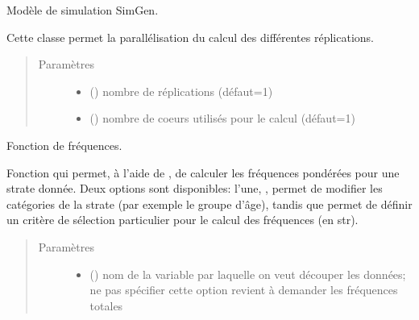 \documentclass[letterpaper,10pt,french]{sphinxmanual}
\begin{document}
\begin{fulllineitems}
\label{\detokenize{code:id0}}
Modèle de simulation SimGen.

Cette classe permet la parallélisation du calcul des différentes réplications.
\begin{quote}\begin{description}
\item[{Paramètres}] \leavevmode\begin{itemize}
\item {} 
 () \textendash{} nombre de réplications (défaut=1)

\item {} 
 () \textendash{} nombre de coeurs utilisés pour le calcul (défaut=1)

\end{itemize}

\end{description}\end{quote}

\begin{fulllineitems}
\label{\detokenize{code:simgen.replicate.freq}}
Fonction de fréquences.

Fonction qui permet, à l’aide de , de calculer les fréquences pondérées pour une strate donnée. Deux options sont disponibles: l’une, , permet de modifier les catégories de la strate (par exemple le groupe d’âge), tandis que  permet de définir un critère de sélection particulier pour le calcul des fréquences (en str).
\begin{quote}\begin{description}
\item[{Paramètres}] \leavevmode\begin{itemize}
\item {} 
 () \textendash{} nom de la variable par laquelle on veut découper les données; ne pas spécifier cette option revient à demander les fréquences totales


\end{itemize}
\end{description}
\end{quote}
\end{fulllineitems}
\end{fulllineitems}
\end{document}
